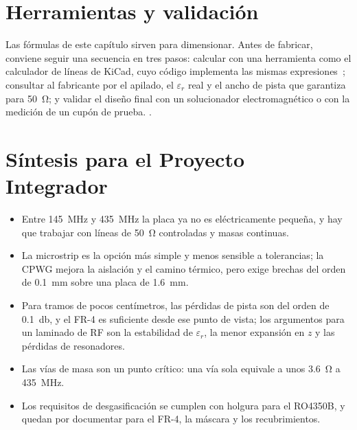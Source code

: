 \section{Herramientas y validación}\label{sec:layout-herramientas}

Las fórmulas de este capítulo sirven para dimensionar. Antes de fabricar, conviene seguir una secuencia en tres pasos: calcular con una herramienta como el calculador de líneas de KiCad, cuyo código implementa las mismas expresiones~\cite{kicadcoplanar}; consultar al fabricante por el apilado, el $\varepsilon_r$ real y el ancho de pista que garantiza para \SI{50}{\ohm}; y validar el diseño final con un solucionador electromagnético o con la medición de un cupón de prueba. .

\section{Síntesis para el Proyecto Integrador}\label{sec:layout-sintesis}

\begin{itemize}
  \item Entre \SI{145}{\mega\hertz} y \SI{435}{\mega\hertz} la placa ya no es eléctricamente pequeña, y hay que trabajar con líneas de \SI{50}{\ohm} controladas y masas continuas.
  \item La microstrip es la opción más simple y menos sensible a tolerancias; la CPWG mejora la aislación y el camino térmico, pero exige brechas del orden de \SI{0,1}{\milli\metre} sobre una placa de \SI{1,6}{\milli\metre}.
  \item Para tramos de pocos centímetros, las pérdidas de pista son del orden de \SI{0,1}{\decibel}, y el FR-4 es suficiente desde ese punto de vista; los argumentos para un laminado de RF son la estabilidad de $\varepsilon_r$, la menor expansión en $z$ y las pérdidas de resonadores.
  \item Las vías de masa son un punto crítico: una vía sola equivale a unos \SI{3,6}{\ohm} a \SI{435}{\mega\hertz}.
  \item Los requisitos de desgasificación se cumplen con holgura para el RO4350B, y quedan por documentar para el FR-4, la máscara y los recubrimientos.
\end{itemize}

